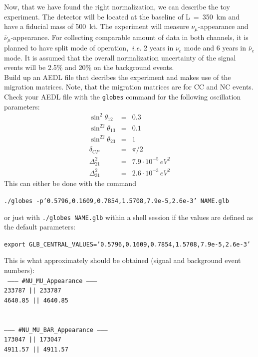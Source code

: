 \documentclass[12pt,a4paper]{article}
\theoremstyle{dotless}
\begin{document}
Now, that we have found the right normalization, we can describe the toy experiment. The detector will
be located at the baseline of L~=~350~km and have a fiducial mass of 500~kt. The experiment
will measure $\nu_\mu$-appearance and $\bar{\nu}_\mu$-appearance. For collecting comparable
amount of data in both channels, it is planned to have split mode of operation,~{\it i.e.}
2 years in $\nu_e$ mode and 6 years in $\bar{\nu}_e$ mode. It is assumed that the overall
normalization uncertainty of the signal events will be 2.5\% and 20\% on the background events. \\

Build up an AEDL file that decribes the experiment and makes use of the migration matrices.
Note, that the migration matrices are for CC and NC events. \\

Check your AEDL file with the {\tt globes} command for the following oscillation parameters:
\begin{eqnarray}
\sin^2\theta_{12} & = & 0.3 \nonumber \\
\sin^22\theta_{13} & = & 0.1  \nonumber \\
\sin^22\theta_{23} & = & 1  \nonumber \\
\delta_{CP} & = & \pi/2  \nonumber \\
\Delta^2_{21} & = & 7.9\cdot 10^{-5}\, eV^2  \nonumber \\
\Delta^2_{31} & = & 2.6\cdot 10^{-3}\, eV^2  
\end{eqnarray}
This can either be done with the command 
\begin{center}
{\tt ./globes -p'0.5796,0.1609,0.7854,1.5708,7.9e-5,2.6e-3' NAME.glb}
\end{center}
or just with {\tt ./globes NAME.glb} within a shell session if the values are defined as the default parameters:
 \begin{center}
{\tt export GLB\_CENTRAL\_VALUES='0.5796,0.1609,0.7854,1.5708,7.9e-5,2.6e-3'}
\end{center}

This is what approximately should be obtained (signal and background event numbers):\\

{\tt 
\hspace*{2cm} --------- \#NU\_MU\_Appearance ---------\\
\hspace*{2cm}               233787 ||       233787\\
\hspace*{2cm}              4640.85 ||      4640.85\\
\hspace*{2cm} \\
\hspace*{2cm} \\
\hspace*{2cm} --------- \#NU\_MU\_BAR\_Appearance ---------\\
\hspace*{2cm}               173047 ||       173047\\
\hspace*{2cm}              4911.57 ||      4911.57\\
}
\end{document}
